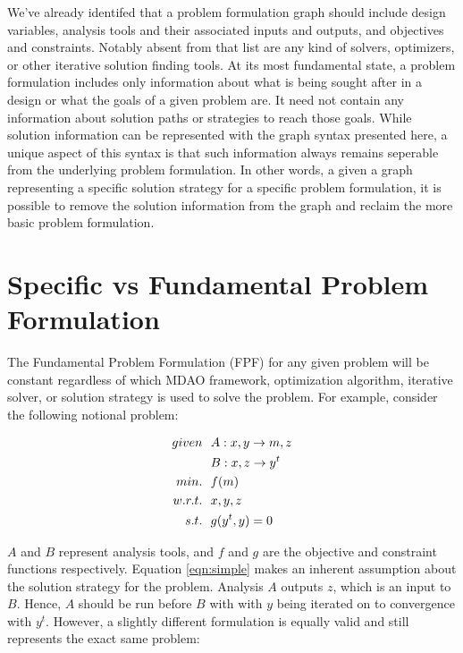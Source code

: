     We've already identifed that a problem formulation graph should include design variables, analysis tools and their 
    associated inputs and outputs, and objectives and constraints. Notably absent from that list are any kind of 
    solvers, optimizers, or other iterative solution finding tools. At its most fundamental state, a problem formulation 
    includes only information about what is being sought after in a design or what the
    goals of a given problem are. It need not contain any information about solution paths or strategies to reach those goals. 
    While solution information can be represented with the graph syntax presented here, a unique aspect of this syntax is that 
    such information always remains seperable from the underlying problem formulation. In other words, a given a graph representing 
    a specific solution strategy for a specific problem formulation, it is possible to remove the solution information from the 
    graph and reclaim the more basic problem formulation. 


\section{Specific vs Fundamental Problem Formulation }

    The Fundamental Problem Formulation (FPF) for any given problem will be constant regardless 
    of which MDAO framework, optimization algorithm, iterative solver, or solution strategy
    is used to solve the problem. For example, consider the following notional problem: 

    \begin{align}
        given & \ \ A: {x,y} \rightarrow {m,z} \notag
        \\      & \ \ B: {x,z} \rightarrow {y^t} \notag
        \\min. &\ \ f(m) \notag
        \\w.r.t. & \ \ x,y,z \notag
        \\s.t. & \ \ g(y^t,y) = 0
        \label{eqn:simple}
    \end{align}

    $A$ and $B$ represent analysis tools, and $f$ and $g$ are the objective and constraint functions respectively. 
    Equation \ref{eqn:simple} makes an inherent assumption about the solution strategy for the problem. 
    Analysis $A$ outputs $z$, which is an input to $B$. Hence, $A$ should be run before $B$ with 
    with $y$ being iterated on to convergence with $y^t$. However, a slightly different formulation is 
    equally valid and still represents the exact same problem: 

